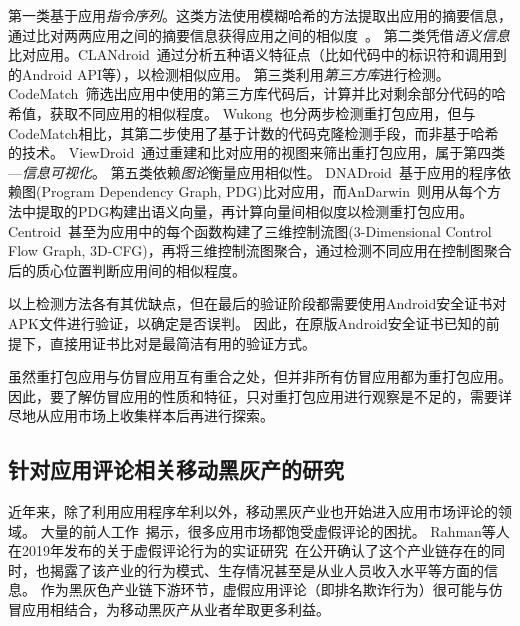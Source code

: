 第一类基于应用\textit{指令序列}。这类方法使用模糊哈希的方法提取出应用的摘要信息，通过比对两两应用之间的摘要信息获得应用之间的相似度~\cite{DroidMOSS, Zheng2013DroidAnalyticsA}。
第二类凭借\textit{语义信息}比对应用。CLANdroid~\cite{CLANdroid}通过分析五种语义特征点（比如代码中的标识符和调用到的Android API等），以检测相似应用。
第三类利用\textit{第三方库}进行检测。CodeMatch~\cite{CodeMatch}筛选出应用中使用的第三方库代码后，计算并比对剩余部分代码的哈希值，获取不同应用的相似程度。
Wukong~\cite{Wukong}也分两步检测重打包应用，但与CodeMatch相比，其第二步使用了基于计数的代码克隆检测手段，而非基于哈希的技术。
ViewDroid~\cite{ViewDroid}通过重建和比对应用的视图来筛出重打包应用，属于第四类---\textit{信息可视化}。
第五类依赖\textit{图论}衡量应用相似性。
DNADroid~\cite{DNADroid}基于应用的程序依赖图(Program Dependency Graph, PDG)比对应用，而AnDarwin~\cite{AnDarwin}则用从每个方法中提取的PDG构建出语义向量，再计算向量间相似度以检测重打包应用。
Centroid~\cite{Centroid}甚至为应用中的每个函数构建了三维控制流图(3-Dimensional Control Flow Graph, 3D-CFG)，再将三维控制流图聚合，通过检测不同应用在控制图聚合后的质心位置判断应用间的相似程度。

以上检测方法各有其优缺点，但在最后的验证阶段都需要使用Android安全证书对APK文件进行验证，以确定是否误判。
因此，在原版Android安全证书已知的前提下，直接用证书比对是最简洁有用的验证方式。

虽然重打包应用与仿冒应用互有重合之处，但并非所有仿冒应用都为重打包应用。
因此，要了解仿冒应用的性质和特征，只对重打包应用进行观察是不足的，需要详尽地从应用市场上收集样本后再进行探索。

\subsection{针对应用评论相关移动黑灰产的研究}
近年来，除了利用应用程序牟利以外，移动黑灰产业也开始进入应用市场评论的领域。
大量的前人工作~\cite{hernandez2019the, xie2014grouptie, zhu2014discovery, hu2019want, chen2017toward, xie2016you, hooi2016fraudar}揭示，很多应用市场都饱受虚假评论的困扰。
Rahman等人在2019年发布的关于虚假评论行为的实证研究~\cite{rahman2019art}在公开确认了这个产业链存在的同时，也揭露了该产业的行为模式、生存情况甚至是从业人员收入水平等方面的信息。
作为黑灰色产业链下游环节，虚假应用评论（即排名欺诈行为）很可能与仿冒应用相结合，为移动黑灰产从业者牟取更多利益。

